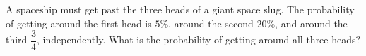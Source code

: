 A spaceship must get past the three heads of a giant space slug. The probability of getting around the first head is $5\%$, around the second $20\%$, and around the third $\dfrac34$, independently. What is the probability of getting around all three heads?
